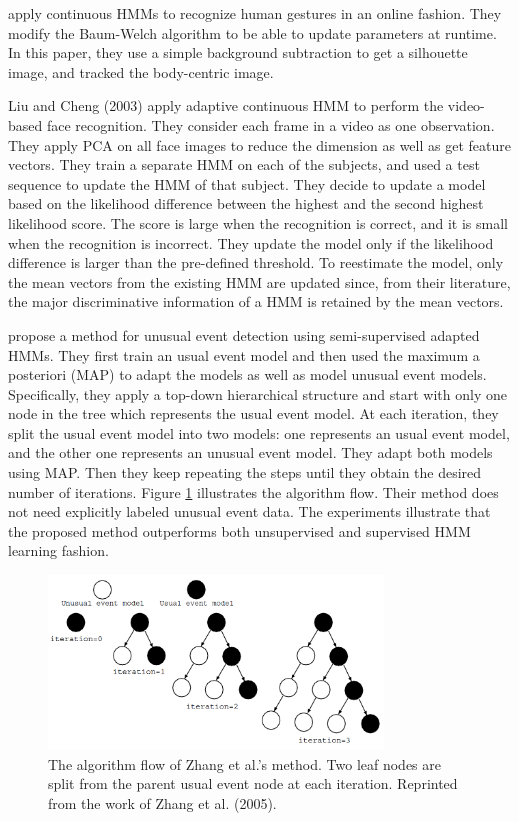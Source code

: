  apply continuous HMMs to recognize human
gestures in an online fashion. They modify the Baum-Welch algorithm to
be able to update parameters at runtime. In this paper, they use a
simple background subtraction to get a silhouette image, and tracked
the body-centric image.

Liu and Cheng (2003)\nocite{liu03face-hmm} apply adaptive continuous
HMM to perform the video-based face recognition. They consider each
frame in a video as one observation. They apply PCA on all face images
to reduce the dimension as well as get feature vectors. They train a
separate HMM on each of the subjects, and used a test sequence to
update the HMM of that subject. They decide to update a model based on
the likelihood difference between the highest and the second highest
likelihood score. The score is large when the recognition is correct,
and it is small when the recognition is incorrect. They update the
model only if the likelihood difference is larger than the pre-defined
threshold. To reestimate the model, only the mean vectors from the
existing HMM are updated since, from their literature, the major
discriminative information of a HMM is retained by the mean vectors.

 propose a method for unusual event
detection using semi-supervised adapted HMMs. They first train an
usual event model and then used the maximum a posteriori (MAP) to
adapt the models as well as model unusual event models. Specifically,
they apply a top-down hierarchical structure and start with only one
node in the tree which represents the usual event model. At each
iteration, they split the usual event model into two models: one
represents an usual event model, and the other one represents an
unusual event model. They adapt both models using MAP. Then they keep
repeating the steps until they obtain the desired number of
iterations. Figure \ref{fig:zhang-algorithm-flow} illustrates the
algorithm flow. Their method does not need explicitly labeled unusual
event data. The experiments illustrate that the proposed method
outperforms both unsupervised and supervised HMM learning fashion.

\begin{figure}[t]
  \begin{center}
    \includegraphics[width=3.5in]{figures/zhang-algorithm-flow.png}
    \caption[The algorithm flow of Zhang et al.'s method]{The
	algorithm flow of Zhang et al.'s method. Two leaf nodes are
	split from the parent usual event node at each
	iteration. Reprinted from the work of Zhang et
	al. (2005).}
    \label{fig:zhang-algorithm-flow}
  \end{center}
\end{figure}

